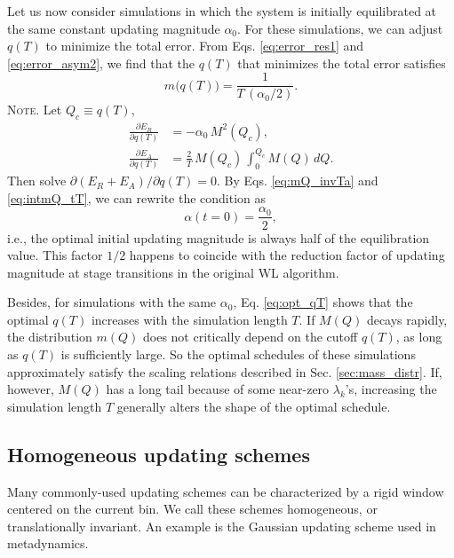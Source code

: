 \documentclass[reprint, floatfix]{revtex4-1}
\newcommand{\note}[1]{{\color{DarkGreen}\footnotesize \textsc{Note.} #1}}
\begin{document}
Let us now consider simulations in which
the system is initially equilibrated at the same
constant updating magnitude $\alpha_0$.
%
For these simulations,
we can adjust $q(T)$
to minimize the total error.
%
From Eqs. \eqref{eq:error_res1}
and \eqref{eq:error_asym2},
we find that
the $q(T)$ that minimizes
the total error satisfies
\begin{equation}
  m\bigl( q(T) \bigr)
  =
  \frac{1} { T \, (\alpha_0 / 2) }
  .
\label{eq:opt_qT}
\end{equation}
%
\note{Let $Q_c \equiv q(T)$,
$$
\begin{aligned}
  \frac{
    \partial E_R
  }
  {
    \partial q(T)
  }
  &=
  -\alpha_0 \, M^2(Q_c)
  ,
  \\
  \frac{
    \partial E_A
  }
  {
    \partial q(T)
  }
  &=
  \frac 2 T \,
  M(Q_c) \,
  \int_0^{ Q_c } M(Q) \, dQ
  .
\end{aligned}
$$
Then solve $\partial (E_R + E_A) / \partial q(T) = 0$.
}%
By Eqs. \eqref{eq:mQ_invTa} and \eqref{eq:intmQ_tT},
we can rewrite the condition as
\begin{equation}
  \alpha( t = 0 )
  =
  \frac{ \alpha_0 }
       { 2 }
  ,
\label{eq:half_alpha0}
\end{equation}
%
i.e., the optimal initial updating magnitude
is always half of the equilibration value.
%
This factor $1/2$
happens to coincide with the
reduction factor of updating magnitude
at stage transitions
in the original WL algorithm\cite{
wang2001, wang2001pre}.


Besides,
for simulations with the same $\alpha_0$,
Eq. \eqref{eq:opt_qT} shows that
the optimal $q(T)$ increases with
the simulation length $T$.
%
If $M(Q)$ decays rapidly,
the distribution $m(Q)$ does not critically
depend on the cutoff $q(T)$,
as long as $q(T)$ is sufficiently large.
%
So the optimal schedules of these simulations
approximately satisfy the scaling relations
described in Sec. \ref{sec:mass_distr}.
%
If, however, $M(Q)$ has a long tail
because of some near-zero $\lambda_k$'s,
increasing the simulation length $T$
generally alters the shape of the optimal schedule.




\subsection{\label{sec:band-matrix}
Homogeneous updating schemes}



Many commonly-used updating schemes
can be characterized by a rigid window
centered on the current bin.
%
We call these schemes homogeneous,
or translationally invariant.
%
An example is the Gaussian updating scheme
used in metadynamics.
\end{document}
